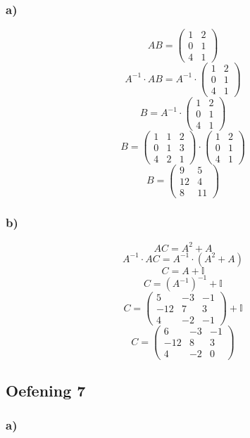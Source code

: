 \documentclass[lineaire_algebra_oplossingen.tex]{subfiles}
\begin{document}
\subsubsection*{a)}
$$ AB =
\begin{pmatrix}
1 & 2 \\
0 & 1 \\
4 & 1
\end{pmatrix}
$$
$$ A^{-1} \cdot AB = A^{-1} \cdot 
\begin{pmatrix}
1 & 2 \\
0 & 1 \\
4 & 1
\end{pmatrix}
$$
$$ B = A^{-1} \cdot
\begin{pmatrix}
1 & 2 \\
0 & 1 \\
4 & 1
\end{pmatrix}
$$
$$ B = 
\begin{pmatrix}
1 & 1 & 2 \\
0 & 1 & 3 \\
4 & 2 & 1
\end{pmatrix}
\cdot
\begin{pmatrix}
1 & 2 \\
0 & 1 \\
4 & 1
\end{pmatrix}
$$
$$ B = 
\begin{pmatrix}
9 & 5 \\
12 & 4 \\
8 & 11
\end{pmatrix}
$$
\subsubsection*{b)}
$$ AC = A^2 + A$$
$$ A^{-1} \cdot AC = A^{-1} \cdot (A^2 + A)$$
$$ C = A + \mathbb{I} $$
$$ C = (A^{-1})^{-1} + \mathbb{I} $$
$$ C = 
\begin{pmatrix}
5 & -3 & -1 \\
-12 & 7 & 3 \\
4 & -2 & -1
\end{pmatrix}
+ \mathbb{I} $$
$$ C = 
\begin{pmatrix}
6 & -3 & -1 \\
-12 & 8 & 3 \\
4 & -2 & 0
\end{pmatrix}
$$
\subsection{Oefening 7}
\subsubsection*{a)}
\end{document}
